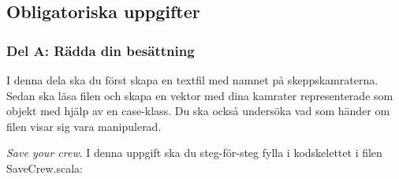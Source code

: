 




\subsection{Obligatoriska uppgifter}

\subsubsection{Del A: Rädda din besättning}

I denna dela ska du först skapa en textfil med namnet på skeppskamraterna. Sedan ska läsa filen och skapa en vektor med dina kamrater representerade som objekt med hjälp av en case-klass. Du ska också undersöka vad som händer om filen visar sig vara manipulerad.

\Task \emph{Save your crew}. I denna uppgift ska du steg-för-steg fylla i kodskelettet i filen SaveCrew.scala:

